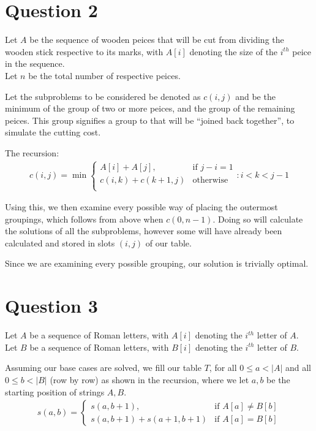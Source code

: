 \documentclass{article}
\begin{document}
\pagebreak
\section*{Question 2}
Let $A$ be the sequence of wooden peices that will be cut from dividing the wooden stick respective to its marks, with $A[i]$ denoting the size of the $i^{th}$ peice in the sequence.\\
Let $n$ be the total number of respective peices.

Let the subproblems to be considered be denoted as $c(i, j)$ and be the minimum of the group of two or more peices, and the group of the remaining peices. This group signifies a group to that will be ``joined back together'', to simulate the cutting cost.

The recursion:
\begin{align*}
c(i, j) = \min
\begin{cases}
    A[i] + A[j],        & \text{if } j - i = 1\\
    c(i, k) + c(k+1, j) & \text{otherwise}\\
\end{cases}
    : i < k < j - 1
\end{align*}

Using this, we then examine every possible way of placing the outermost groupings, which follows from above when $c(0, n-1)$. Doing so will calculate the solutions of all the subproblems, however some will have already been calculated and stored in slots $(i, j)$ of our table.

Since we are examining every possible grouping, our solution is trivially optimal.

\section*{Question 3}
Let $A$ be a sequence of Roman letters, with $A[i]$ denoting the $i^{th}$ letter of $A$.\\
Let $B$ be a sequence of Roman letters, with $B[i]$ denoting the $i^{th}$ letter of $B$.

Assuming our base cases are solved, we fill our table $T$, for all $0 \leq a < |A|$ and all $0 \leq b < |B|$ (row by row) as shown in the recursion, where we let $a, b$ be the starting position of strings $A, B$.
\begin{align*}
s(a, b) =
\begin{cases}
    s(a, b+1),              & \text{if } A[a] \neq B[b]\\
    s(a, b+1) + s(a+1, b+1) & \text{if } A[a] = B[b]
\end{cases}
\end{align*}
\end{document}
